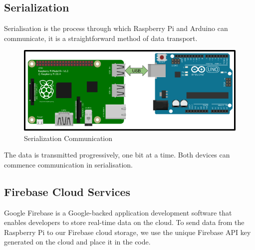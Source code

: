 \documentclass[conference,a4paper]{IEEEtran}
\begin{document}
\subsection{Serialization}
Serialisation is the process through which Raspberry Pi and Arduino can communicate, it is a straightforward method of data transport. 

\begin{figure}[ht]
\centering
\includegraphics[width=1\linewidth]{serial.png}
\caption{Serialization Communication}
\label{Fig: Seralization}
\end{figure}
The data is transmitted progressively, one bit at a time. Both devices can commence communication in serialisation. \cite{17}
\subsection{Firebase Cloud Services}
Google Firebase is a Google-backed application development software that enables developers to store real-time data on the cloud. To send data from the Raspberry Pi to our Firebase cloud storage, we use the unique Firebase API key generated on the cloud and place it in the code.
\end{document}
